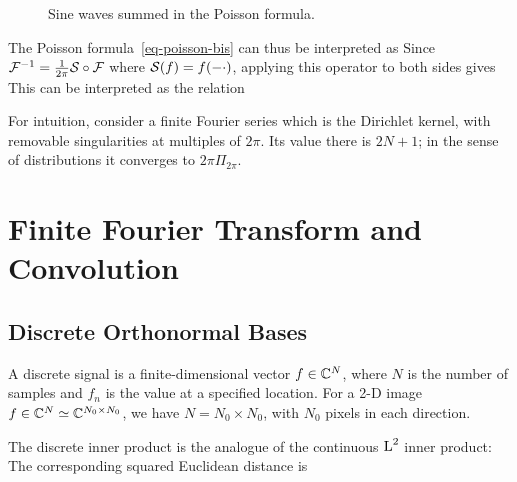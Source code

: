 \begin{figure}[tbp]
\centering
{}
\caption{Sine waves summed in the Poisson formula.}
\label{fig-review-fourier-poisson-distrib}
\end{figure}
The Poisson formula~\eqref{eq-poisson-bis} can thus be interpreted as
Since $\mathcal{F}^{-1} = \frac{1}{2\pi} \mathcal{S} \circ \mathcal{F}$ where $\mathcal{S}(f)=f(-\cdot)$, applying this operator to both sides gives
This can be interpreted as the relation

For intuition, consider a finite Fourier series
which is the Dirichlet kernel, with removable singularities at multiples of $2\pi$. Its value there is $2N+1$; in the sense of distributions it converges to $2\pi\Pi_{2\pi}$.

\section{Finite Fourier Transform and Convolution}
\label{sec-dft}

\subsection{Discrete Orthonormal Bases}

A discrete signal is a finite-dimensional vector $f \in \mathbb{C}^N$, where $N$ is the number of samples and $f_n$ is the value at a specified location. For a 2-D image $f \in \mathbb{C}^N \simeq \mathbb{C}^{N_0 \times N_0}$, we have $N = N_0 \times N_0$, with $N_0$ pixels in each direction.

The discrete inner product is the analogue of the continuous $\text{\upshape L}^2$ inner product:
The corresponding squared Euclidean distance is

